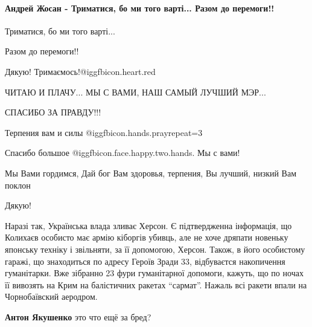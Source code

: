  
 
 
 
 
\paragraph{Андрей Жосан - Триматися, бо ми того варті... Разом до перемоги!!}
\label{sec:22_04_2022.fb.kolyhaev_igor.herson.mer.1.herson.cmt.zhosan.razom_do_peremogy}

\begin{itemize} %

Триматися, бо ми того варті...

Разом до перемоги!!

Дякую! Тримаємось!@igg{fbicon.heart.red}


ЧИТАЮ И ПЛАЧУ... МЫ С ВАМИ, НАШ САМЫЙ ЛУЧШИЙ МЭР...

СПАСИБО ЗА ПРАВДУ!!!

Терпения вам и силы @igg{fbicon.hands.pray}{repeat=3} 

Спасибо большое  @igg{fbicon.face.happy.two.hands}. Мы с вами!

Мы Вами гордимся, Дай бог Вам здоровья, терпения, Вы лучший, низкий Вам поклон

Дякую!


Наразі так, Українська влада зливає Херсон. Є підтвердженна інформація, що
Колихаєв особисто має армію кіборгів убивць, але не хоче дряпати новеньку
японську техніку і звільняти, за її допомогою, Херсон. Також, в його особистому
гаражі, що знаходиться по адресу Героїв Зради 33, відбуваєтся накопичення
гуманітарки. Вже зібранно 23 фури гуманітарної допомоги, кажуть, що по ночах її
вивозять на Крим на балістичних ракетах \enquote{сармат}. Нажаль всі ракети впали на
Чорнобаївский аеродром.

\begin{itemize} %
\textbf{Антон Якушенко} это что ещё за бред?


\end{itemize}
\end{itemize}
